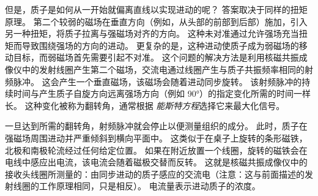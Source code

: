 但是，质子是如何从一开始就偏离直线以实现进动的呢？ 
答案取决于同样的扭矩原理。 
第二个较弱的磁场在垂直方向（例如，从头部的前部到后部）施加，引入另一种扭矩，将质子拉离与强磁场对齐的方向。
这种未对准通过允许强场充当扭矩而导致围绕强场的方向的进动。
更复杂的是，这种进动使质子成为弱磁场的移动目标，而弱磁场首先需要引起不对准。
这个问题的解决方法是利用核磁共振成像仪中的发射线圈产生第二个磁场，交流电通过线圈产生与质子共振频率相同的射频脉冲。
这会产生一个垂直磁场，该磁场会随着进动同步旋转。
该射频脉冲的持续时间与产生质子自旋方向远离强场方向（例如 90°）的指定变化所需的时间一样长。
这种变化被称为翻转角，通常根据 \textit{能斯特方程}选择它来最大化信号。


一旦达到所需的翻转角，射频脉冲就会停止以便测量组织的成分。
此时，质子在强磁场周围进动并严重倾斜到横向平面中。
这类似于在桌子上旋转的条形磁铁，北极和南极轮流经过任何给定位置。
如果在附近放置一个线圈，旋转的磁铁会在电线中感应出电流，该电流会随着磁极交替而反转。
这就是核磁共振成像仪中的接收头线圈所测量的：由同步进动的质子感应的交流电（注意：这与前面描述的发射线圈的工作原理相同，只是相反）。
电流量表示进动质子的浓度。



